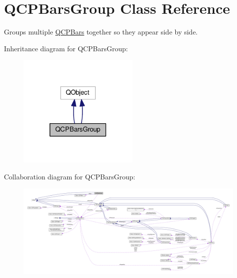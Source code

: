 \hypertarget{class_q_c_p_bars_group}{}\section{Q\+C\+P\+Bars\+Group Class Reference}
\label{class_q_c_p_bars_group}


Groups multiple \hyperlink{class_q_c_p_bars}{Q\+C\+P\+Bars} together so they appear side by side.  




Inheritance diagram for Q\+C\+P\+Bars\+Group\+:\nopagebreak
\begin{figure}[H]
\begin{center}
\leavevmode
\includegraphics[width=165pt]{class_q_c_p_bars_group__inherit__graph}
\end{center}
\end{figure}


Collaboration diagram for Q\+C\+P\+Bars\+Group\+:\nopagebreak
\begin{figure}[H]
\begin{center}
\leavevmode
\includegraphics[width=350pt]{class_q_c_p_bars_group__coll__graph}
\end{center}
\end{figure}
